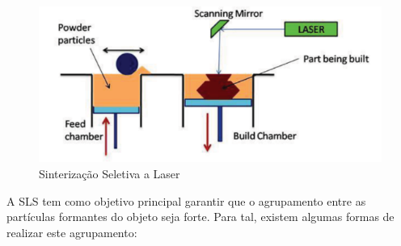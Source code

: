 \documentclass[12pt, english]{article}
\begin{document}
\begin{figure}[H]
	\centering
	\includegraphics[scale=0.8]{SLS.png}
	\caption{Sinterização Seletiva a Laser}
\end{figure}

A SLS tem como objetivo principal garantir que o agrupamento entre as partículas formantes do objeto seja forte. Para tal, existem algumas formas de realizar este agrupamento:
\end{document}
